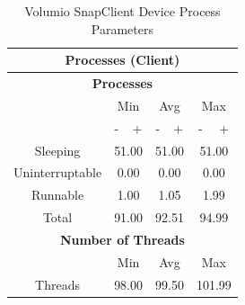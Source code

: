 \documentclass[11pt,a4paper,headinclude=false,footinclude=false]{scrreprt}
\begin{document}
\begin{table}[H]
\centering
    \begin{tabular}{||c|c|c|c|c|c|c||}
    \hline
    \multicolumn{7}{|c|}{\textbf{Processes (Client)}} \\
    \hline
    \multicolumn{7}{|c|}{\textbf{Processes}} \\
    \hline\hline
      & \multicolumn{2}{|c|}{Min} & \multicolumn{2}{|c|}{Avg} & \multicolumn{2}{|c|}{Max} \\
    \hline
      & - & + & - & + & - & + \\
    \hline
    Sleeping & \multicolumn{2}{|c|}{51.00} & \multicolumn{2}{|c|}{51.00} & \multicolumn{2}{|c|}{51.00} \\
    \hline
    Uninterruptable & \multicolumn{2}{|c|}{0.00} & \multicolumn{2}{|c|}{0.00} & \multicolumn{2}{|c|}{0.00} \\
    \hline
    Runnable & \multicolumn{2}{|c|}{1.00} & \multicolumn{2}{|c|}{1.05} & \multicolumn{2}{|c|}{1.99} \\
    \hline
    Total & \multicolumn{2}{|c|}{91.00} & \multicolumn{2}{|c|}{92.51} & \multicolumn{2}{|c|}{94.99} \\
    \hline\hline
    \multicolumn{7}{|c|}{\textbf{Number of Threads}} \\
    \hline\hline
      & \multicolumn{2}{|c|}{Min} & \multicolumn{2}{|c|}{Avg} & \multicolumn{2}{|c|}{Max} \\
    \hline
    Threads  & \multicolumn{2}{|c|}{98.00} & \multicolumn{2}{|c|}{99.50} & \multicolumn{2}{|c|}{101.99} \\
    \hline\hline
    \end{tabular}
    \caption{Volumio SnapClient Device Process Parameters}
    \label{VolumioclientProcessTab}
\end{table}
\end{document}

